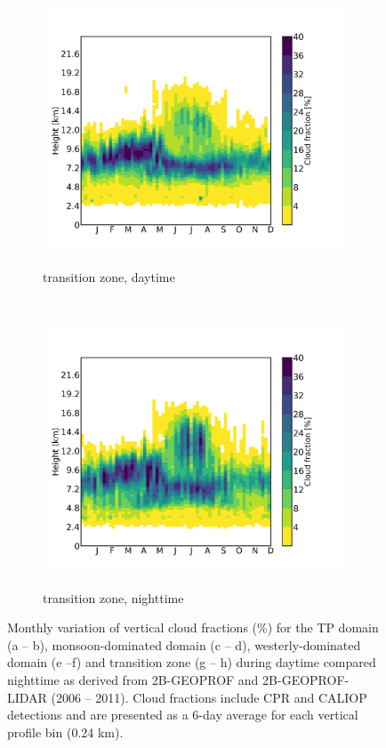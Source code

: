 \documentclass[alpha-refs]{wiley-article}
\begin{document}
\begin{figure}\ContinuedFloat
    \begin{subfigure}[b]{0.5\textwidth}
        \centering
        \caption{transition zone, daytime }        
        \includegraphics[width=\textwidth]{cloudsat_cloudfract_seasonal_transitionmode_day.png}
              \label{fig:vertical_cloudfract7}

    \end{subfigure}%
    ~ 
    \begin{subfigure}[b]{0.5\textwidth}
        \centering
        \caption{transition zone, nighttime }        
        \includegraphics[width=\textwidth]{cloudsat_cloudfract_seasonal_transitionmode_night.png}
              \label{fig:vertical_cloudfract8}
        \end{subfigure}   
    \caption{Monthly variation of vertical cloud fractions (\%) for the TP domain (a -- b), monsoon-dominated domain (c -- d), westerly-dominated domain (e --f) and transition zone (g -- h) during daytime compared nighttime as derived from 2B-GEOPROF and 2B-GEOPROF-LIDAR (2006 -- 2011). Cloud fractions include CPR and CALIOP detections and are presented as a 6-day average for each vertical profile bin (0.24 km).}   
\label{fig:vertical_cloudfract}
\end{figure}
\end{document}

